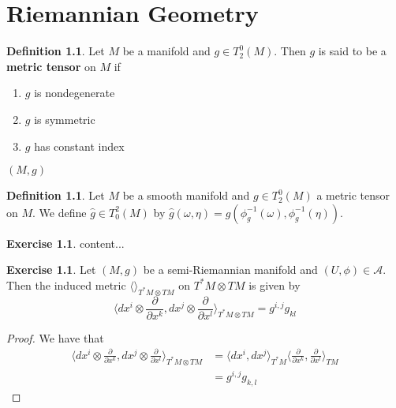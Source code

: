 \documentclass{book}
\theoremstyle{definition}
\newtheorem{defn}[definition]{Definition}
\newtheorem{ex}[definition]{Exercise}
\newcommand{\om}{\omega}
\newcommand{\MA}{\mathcal{A}}
\DeclareMathOperator*{\0}{\mbf{0}}
\DeclareMathOperator*{\1}{\mbf{1}}
\renewcommand{\r}{\rangle}
\renewcommand{\l}{\langle}
\newcommand{\tbf}[1]{\textbf{#1}}
\newcommand{\p}{\partial}
\begin{document}
	\newpage
	\chapter{Riemannian Geometry}
	
	\begin{defn}
		Let $M$ be a manifold and $g \in T^0_2(M)$. Then $g$ is said to be a \tbf{metric tensor} on $M$ if 
		\begin{enumerate}
			\item $g$ is nondegenerate
			\item $g$ is symmetric
			\item $g$ has constant index
		\end{enumerate}
		 $(M, g)$
	\end{defn}



	\begin{defn}
		Let $M$ be a smooth manifold and $g \in T^0_2(M)$ a metric tensor on $M$. We define $\hat{g} \in T^2_0(M)$ by $\hat{g}(\om, \eta) = g(\phi_g^{-1}(\om), \phi_g^{-1}(\eta))$. 
	\end{defn}

	\begin{ex}
		content...
	\end{ex}

	\begin{ex}
		Let $(M, g)$ be a semi-Riemannian manifold and $(U, \phi) \in \MA$. Then the induced metric $\l \r_{T^*M \otimes TM}$ on $T^*M \otimes TM$ is given by 
		$$\bigg \l dx^i \otimes \frac{\p }{\p x^k}, dx^j \otimes \frac{\p}{\p x^l} \bigg \r_{T^*M \otimes TM} = g^{i,j}g_{kl}$$
	\end{ex}

	\begin{proof}
		We have that 
		\begin{align*}
			\bigg \l dx^i \otimes \frac{\p }{\p x^k}, dx^j \otimes \frac{\p}{\p x^l} \bigg \r_{T^*M \otimes TM}
			& = \l dx^i , dx^j \r_{T^*M} \bigg \l \frac{\p }{\p x^k}, \frac{\p }{\p x^l} \bigg \r_{TM} \\
			& = g^{i,j}g_{k,l}
		\end{align*}
	\end{proof}
\end{document}
